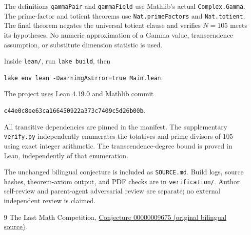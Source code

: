 \documentclass[11pt]{article}
\begin{document}
The definitions \texttt{gammaPair} and \texttt{gammaField} use Mathlib's actual \texttt{Complex.Gamma}. The prime-factor and totient theorems use \texttt{Nat.primeFactors} and \texttt{Nat.totient}. The final theorem negates the universal totient clause and verifies $N=105$ meets its hypotheses. No numeric approximation of a Gamma value, transcendence assumption, or substitute dimension statistic is used.

Inside \texttt{lean/}, run \texttt{lake build}, then
\begin{center}\texttt{lake env lean -DwarningAsError=true Main.lean}.\end{center}
The project uses Lean 4.19.0 and Mathlib commit
\begin{center}\small\texttt{c44e0c8ee63ca166450922a373c7409c5d26b00b}.\end{center}
All transitive dependencies are pinned in the manifest. The supplementary \texttt{verify.py} independently enumerates the totatives and prime divisors of $105$ using exact integer arithmetic. The transcendence-degree bound is proved in Lean, independently of that enumeration.

The unchanged bilingual conjecture is included as \texttt{SOURCE.md}. Build logs, source hashes, theorem-axiom output, and PDF checks are in \texttt{verification/}. Author self-review and parent-agent adversarial review are separate; no external independent review is claimed.

\begin{thebibliography}{9}
 The Last Math Competition,
\href{https://github.com/The-Last-Math-Competition/The-Last-Math-Competition/blob/main/conjectures/00000009675.md}{Conjecture 00000009675 (original bilingual source)}.
\end{thebibliography}
\end{document}
